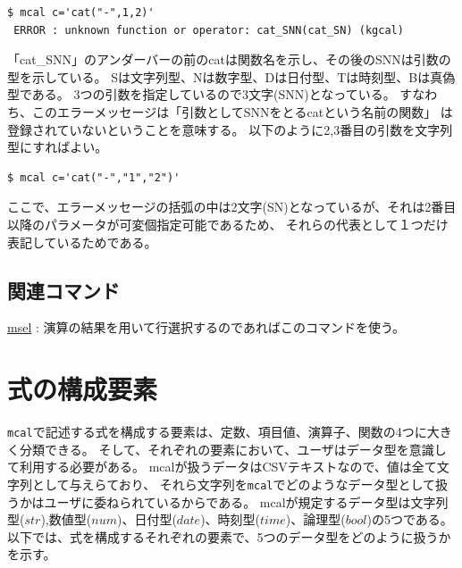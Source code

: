 \begin{Verbatim}[baselinestretch=0.7,frame=single,fontsize=\small]
 $ mcal c='cat("-",1,2)'
 ERROR : unknown function or operator: cat_SNN(cat_SN) (kgcal)
\end{Verbatim}

「cat\_SNN」のアンダーバーの前のcatは関数名を示し、その後のSNNは引数の型を示している。
Sは文字列型、Nは数字型、Dは日付型、Tは時刻型、Bは真偽型である。
3つの引数を指定しているので3文字(SNN)となっている。
すなわち、このエラーメッセージは「引数としてSNNをとるcatという名前の関数」
は登録されていないということを意味する。
以下のように2,3番目の引数を文字列型にすればよい。
\begin{Verbatim}[baselinestretch=0.7,frame=single,fontsize=\small]
 $ mcal c='cat("-","1","2")'
\end{Verbatim}

ここで、エラーメッセージの括弧の中は2文字(SN)となっているが、それは2番目以降のパラメータが可変個指定可能であるため、
それらの代表として１つだけ表記しているためである。


\subsection*{関連コマンド}
\hyperref[sect:msel]{msel} : 演算の結果を用いて行選択するのであればこのコマンドを使う。



\section{式の構成要素\label{sec:elem}}
\verb|mcal|で記述する式を構成する要素は、定数、項目値、演算子、関数の4つに大きく分類できる。
そして、それぞれの要素において、ユーザはデータ型を意識して利用する必要がある。
mcalが扱うデータはCSVテキストなので、値は全て文字列として与えらており、
それら文字列を\verb|mcal|でどのようなデータ型として扱うかはユーザに委ねられているからである。
mcalが規定するデータ型は文字列型($str$),数値型($num$)、日付型($date$)、時刻型($time$)、論理型($bool$)の5つである。
以下では、式を構成するそれぞれの要素で、5つのデータ型をどのように扱うかを示す。

